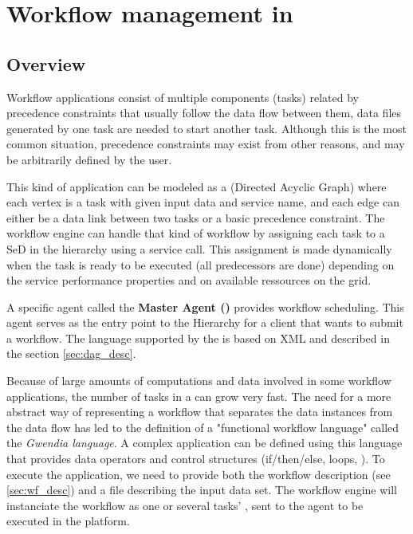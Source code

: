 
\chapter{Workflow management in \textsc{\diet}}
\label{ch:workflows}

\section{Overview}

Workflow applications consist of multiple components (tasks) related by
precedence constraints that usually follow the data flow between
them, \ie data files generated by one task are needed to start another
task. Although this is the most common situation, precedence constraints
may exist from other reasons, and may be arbitrarily defined by the
user.

This kind of application can be modeled as a \DAG (Directed Acyclic Graph) where
each vertex is a task with given input data and service name, and each edge can
either be a data link between two tasks or a basic precedence constraint. The
\diet workflow engine can handle that kind of workflow by assigning each task
to a SeD in the \diet hierarchy using a \diet service call. This assignment is
made dynamically when the task is ready to be executed (\ie all predecessors
are done) depending on the service performance properties and on available
ressources on the grid.

A specific agent called the \textbf{Master Agent \DAG (\madag)} provides \DAG
workflow scheduling. This agent serves as the entry point to the \diet
Hierarchy for a client that wants to submit a workflow. The language
supported by the \madag is based on XML and described in
the section \ref{sec:dag_desc}.

Because of large amounts of computations and data involved in some workflow
applications, the number of tasks in a \DAG can grow very fast. The need for a
more abstract way of representing a workflow that separates the data instances
from the data flow has led to the definition of a "functional workflow
language" called the \textit{Gwendia language}. A complex application can be
defined using this language that provides data operators and control structures
(if/then/else, loops, \etc). To execute the application, we need to provide both
the workflow description (see \ref{sec:wf_desc}) and a file describing the
input data set. The \diet workflow engine will instanciate the workflow as one
or several tasks' \DAGS, sent to the \madag agent to be executed in the
\diet platform.

